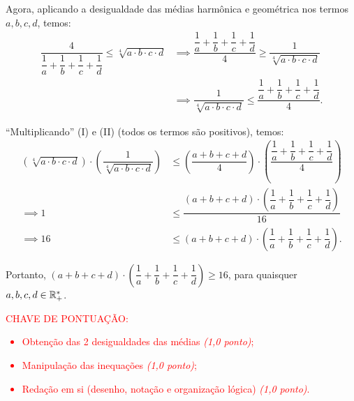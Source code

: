 Agora, aplicando a desigualdade das médias harmônica e geométrica nos termos
$a, b, c, d$, temos:
\begin{align*}
    \dfrac{4}{\dfrac{1}{a}+\dfrac{1}{b}+\dfrac{1}{c}+\dfrac{1}{d}} \leq \sqrt[4]{a\cdot b\cdot c\cdot d} & \implies \dfrac{\dfrac{1}{a}+\dfrac{1}{b}+\dfrac{1}{c}+\dfrac{1}{d}}{4} \geq \dfrac{1}{\sqrt[4]{a\cdot b\cdot c\cdot d}}            \\
                                                                                                         & \implies \dfrac{1}{\sqrt[4]{a\cdot b\cdot c\cdot d}} \leq  \dfrac{\dfrac{1}{a}+\dfrac{1}{b}+\dfrac{1}{c}+\dfrac{1}{d}}{4}. \tag{II}
\end{align*}

``Multiplicando'' (I) e (II) (todos os termos são positivos), temos:
\begin{align*}
    \left(\sqrt[4]{a\cdot b\cdot c\cdot d}\right) \cdot \left(\dfrac{1}{\sqrt[4]{a\cdot b\cdot c\cdot d}}\right) & \leq \left(\dfrac{a+b+c+d}{4}\right) \cdot \left(\dfrac{\dfrac{1}{a}+\dfrac{1}{b}+\dfrac{1}{c}+\dfrac{1}{d}}{4}\right) \\
    \implies 1                                                                                                   & \leq \dfrac{(a+b+c+d)\cdot \left(\dfrac{1}{a}+\dfrac{1}{b}+\dfrac{1}{c}+\dfrac{1}{d}\right)}{16}                       \\
    \implies 16                                                                                                  & \leq (a+b+c+d) \cdot \left(\dfrac{1}{a}+\dfrac{1}{b}+\dfrac{1}{c}+\dfrac{1}{d}\right).
\end{align*}

Portanto, $(a+b+c+d) \cdot
    \left(\dfrac{1}{a}+\dfrac{1}{b}+\dfrac{1}{c}+\dfrac{1}{d}\right) \geq 16$, para
quaisquer $a, b, c, d \in \mathbb R_+^\ast$.




\bigskip

\textcolor{red}{CHAVE DE PONTUAÇÃO:
    \begin{itemize}
        \item  Obtenção das 2 desigualdades das médias \emph{(1,0 ponto)};
        \item Manipulação das inequações \emph{(1,0 ponto)};
        \item  Redação em si (desenho, notação e organização lógica) \emph{(1,0 ponto)}.
    \end{itemize} }